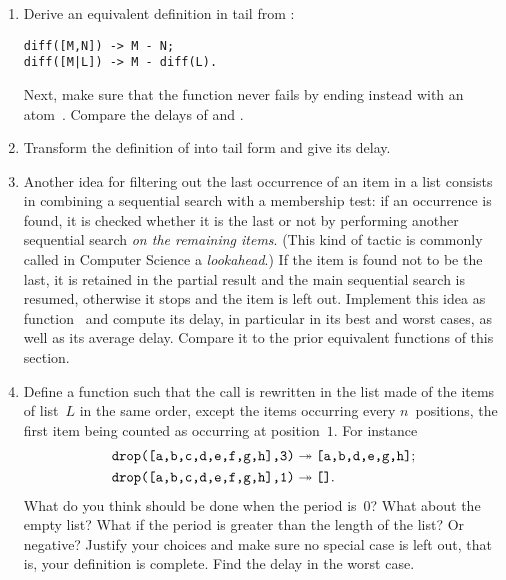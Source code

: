 \begin{enumerate}

  \item Derive an equivalent definition  in tail
    from :
\begin{verbatim}
diff([M,N]) -> M - N;
diff([M|L]) -> M - diff(L).
\end{verbatim}
Next, make sure that the function never fails by ending instead with
an atom~. Compare the delays of
 and .

  \item Transform the definition of  into tail form
     and give its delay.



  \item Another idea for filtering out the last occurrence of an item
    in a list consists in combining a sequential search with a
    membership test: if an occurrence is found, it is checked whether
    it is the last or not by performing another sequential search
    \emph{on the remaining items}. (This kind of tactic is commonly
    called in Computer Science a \emph{lookahead}.) If the item is
    found not to be the last, it is retained in the partial result and
    the main sequential search is resumed, otherwise it stops and the
    item is left out. Implement this idea as
    function~ and compute its delay, in particular
    in its best and worst cases, as well as its average delay. Compare
    it to the prior equivalent functions of this section.

  \item Define a function  such that the call
     is rewritten in the list made of the
    items of list~\(L\) in the same order, except the items occurring
    every \(n\)~positions, the first item being counted as occurring
    at position~\(1\). For instance
    \begin{align*}
      \texttt{drop([a,b,c,d,e,f,g,h],3)} &\twoheadrightarrow
      \texttt{[a,b,d,e,g,h]};\\ \texttt{drop([a,b,c,d,e,f,g,h],1)}
      &\twoheadrightarrow \texttt{[]}.
    \end{align*}
   What do you think should be done when the period is~\(0\)? What
   about the empty list? What if the period is greater than the length
   of the list? Or negative? Justify your choices and make sure no
   special case is left out, that is, your definition is complete. Find
   the delay in the worst case.


\end{enumerate}
